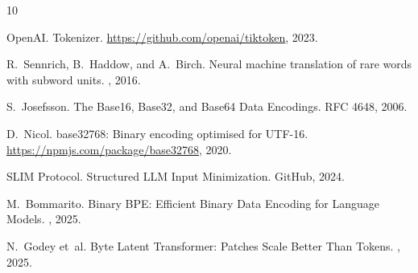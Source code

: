 \documentclass[10pt,twocolumn,letterpaper]{article}
\begin{document}
{\small

\begin{thebibliography}{10}\itemsep=-1pt

OpenAI.
\newblock Tokenizer.
\newblock \url{https://github.com/openai/tiktoken}, 2023.

R.~Sennrich, B.~Haddow, and A.~Birch.
\newblock Neural machine translation of rare words with subword units.
, 2016.

S.~Josefsson.
\newblock The Base16, Base32, and Base64 Data Encodings.
\newblock RFC 4648, 2006.

D.~Nicol.
\newblock base32768: Binary encoding optimised for UTF-16.
\newblock \url{https://npmjs.com/package/base32768}, 2020.

SLIM Protocol.
\newblock Structured LLM Input Minimization.
\newblock GitHub, 2024.

M.~Bommarito.
\newblock Binary BPE: Efficient Binary Data Encoding for Language Models.
, 2025.

N.~Godey et~al.
\newblock Byte Latent Transformer: Patches Scale Better Than Tokens.
, 2025.

\end{thebibliography}
}
\end{document}

